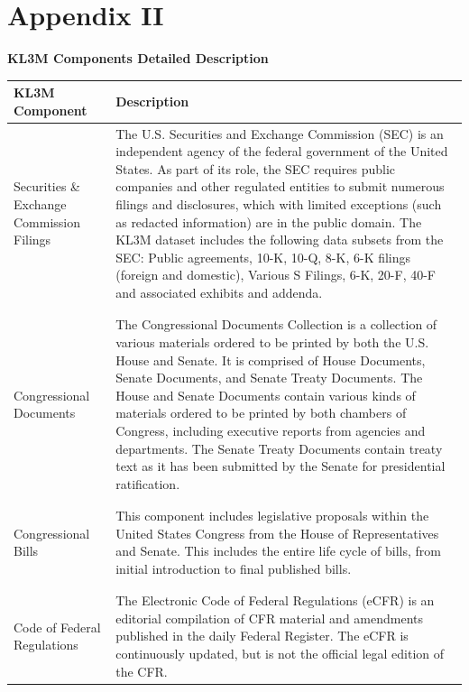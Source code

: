 \section{\textbf{Appendix II}}
\setcounter{secnumdepth}{0}
\large {\textbf{KL3M Components Detailed Description}}
\begin{table}[h!]
\scriptsize
\begin{longtable}{ p{3cm} p{9cm} }
\textbf{KL3M Component}
& \textbf{Description}
\\\midrule
Securities \& Exchange Commission Filings & The U.S. Securities and Exchange Commission (SEC) is an independent agency of the federal government of the United States. As part of its role, the SEC requires public companies and other regulated entities to submit numerous filings and disclosures, which with limited exceptions (such as redacted information) are in the public domain. The KL3M dataset includes the following data subsets from the SEC: Public agreements, 10-K, 10-Q, 8-K, 6-K filings (foreign and domestic), Various S Filings, 6-K, 20-F, 40-F and associated exhibits and addenda.
\\
 \\\hline
 \\
Congressional Documents
& The Congressional Documents Collection is a collection of various materials ordered to be printed by both the U.S. House and Senate. It is comprised of House Documents, Senate Documents, and Senate Treaty Documents. The House and Senate Documents contain various kinds of materials ordered to be printed by both chambers of Congress, including executive reports from agencies and departments. The Senate Treaty Documents contain treaty text as it has been submitted by the Senate for presidential ratification.
\\
 \\\hline
  \\
Congressional Bills &
This component includes legislative proposals within the United States Congress from the House of Representatives and Senate. This includes the entire life cycle of bills, from initial introduction to final published bills.
\\
 \\\hline
  \\
Code of Federal Regulations &
The Electronic Code of Federal Regulations (eCFR) is an editorial compilation of CFR material and amendments published in the daily Federal Register. The eCFR is continuously updated, but is not the official legal edition of the CFR.
\\

\end{longtable}
\end{table}
